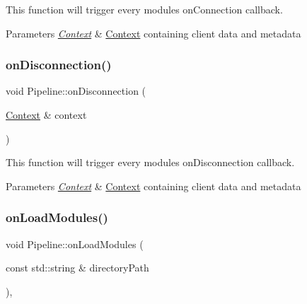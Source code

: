 This function will trigger every module\textquotesingle{}s \textquotesingle{}on\+Connection\textquotesingle{} callback. 


\begin{DoxyParams}{Parameters}
{\em \mbox{\hyperlink{classo_z_1_1_context}{Context}}} & \mbox{\hyperlink{classo_z_1_1_context}{Context}} containing client data and metadata \\
\hline
\end{DoxyParams}
\mbox{\label{classo_z_1_1_pipeline_a4245ad0f1fb310cf19986dbaf0bff3d2}} 
\subsubsection{\texorpdfstring{onDisconnection()}{onDisconnection()}}
{\footnotesize\ttfamily void Pipeline\+::on\+Disconnection (\begin{DoxyParamCaption}\item[{\mbox{\hyperlink{classo_z_1_1_context}{Context}} \&}]{context }\end{DoxyParamCaption})\hspace{0.3cm}{\ttfamily [virtual]}}



This function will trigger every module\textquotesingle{}s \textquotesingle{}on\+Disconnection\textquotesingle{} callback. 


\begin{DoxyParams}{Parameters}
{\em \mbox{\hyperlink{classo_z_1_1_context}{Context}}} & \mbox{\hyperlink{classo_z_1_1_context}{Context}} containing client data and metadata \\
\hline
\end{DoxyParams}
\mbox{\label{classo_z_1_1_pipeline_a0265d90a5540e69b25069d5d96973c53}} 
\subsubsection{\texorpdfstring{onLoadModules()}{onLoadModules()}}
{\footnotesize\ttfamily void Pipeline\+::on\+Load\+Modules (\begin{DoxyParamCaption}\item[{const std\+::string \&}]{directory\+Path }\end{DoxyParamCaption})\hspace{0.3cm}{\ttfamily [protected]}, {\ttfamily [virtual]}}



